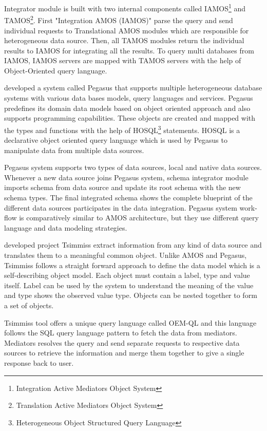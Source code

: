 	
	Integrator module is built with two internal components called IAMOS\footnote{\label{amos}Integration Active Mediators Object System} and TAMOS\footnote{\label{amos}Translation Active Mediators Object System}. 
	First "Integration AMOS (IAMOS)" parse the query and send individual requests to Translational AMOS modules which are responsible for heterogeneous data source.
	Then, all TAMOS modules return the individual results to IAMOS for integrating all the results. To query multi databases from IAMOS, IAMOS servers are mapped with TAMOS servers with the help of Object-Oriented query language.
	
	\citet{ahmed1991pegasus} developed a system called Pegasus that supports multiple heterogeneous database systems with various data bases models, query languages and services. Pegasus predefines its domain data models based on object oriented approach and also supports programming capabilities. These objects are created and mapped with the types and functions with the help of HOSQL\footnote{\label{myfootnote}Heterogeneous Object Structured Query Language} statements. HOSQL is a declarative object oriented query language which is used by Pegasus to manipulate data from multiple data sources.
	
	
	
	Pegasus system supports two types of data sources, local and native data sources. Whenever a new data source joins Pegasus system, schema integrator module imports schema from data source and update its root schema with the new schema types. The final integrated schema shows the complete blueprint of the different data sources participates in the data integration. Pegasus system work-flow is comparatively similar to AMOS architecture, but they use different query language and data modeling strategies.
	
	\citet{chawathe1994tsimmis} developed project Tsimmiss extract information from any kind of data source and translates them to a meaningful common object. Unlike AMOS and Pegasus, Tsimmiss follows a straight forward approach to define the data model which is a self-describing object model. Each object must contain a label, type and value itself. Label can be used by the system to understand the meaning of the value and type shows the observed value type. Objects can be nested together to form a set of objects. 
	
	Tsimmiss tool offers a unique query language called OEM-QL and this language follows the SQL query language pattern to fetch the data from mediators. Mediators resolves the query and send separate requests to respective data sources to retrieve the information and merge them together to give a single response back to user.
	
